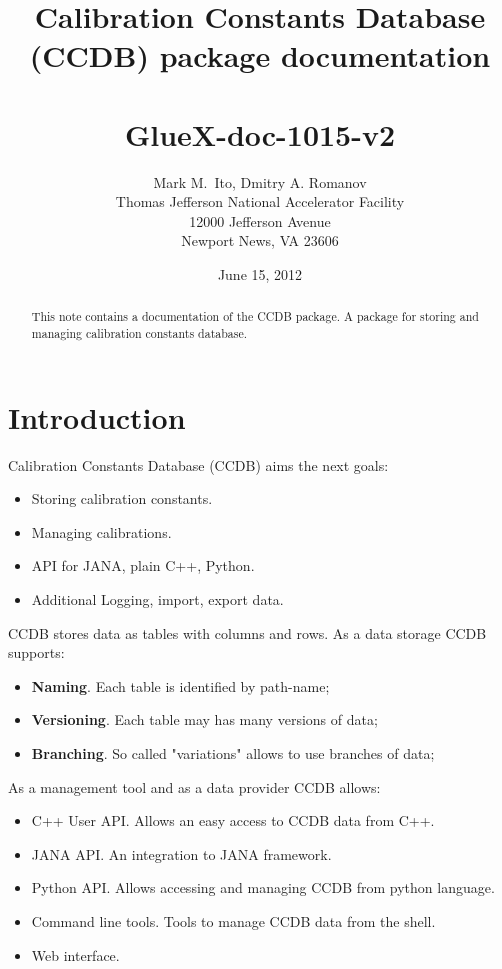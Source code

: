 \documentclass{article}
\title{Calibration Constants Database (CCDB) package documentation \\
~\\
\large GlueX-doc-1015-v2
}
\author{Mark M.\ Ito, Dmitry A. Romanov \\
Thomas Jefferson National Accelerator Facility \\
12000 Jefferson Avenue \\
Newport News, VA 23606
}
\date{June 15, 2012}
\begin{document}


\maketitle

\begin{abstract}
This note contains a documentation of the CCDB package. A package for storing
and managing calibration constants database.
\end{abstract}

\tableofcontents


\newpage
\section{Introduction}

%

Calibration Constants Database (CCDB) aims the next goals:
\begin{itemize}
  \item Storing calibration constants.
  \item Managing calibrations.
  \item API for JANA, plain C++, Python.
  \item Additional Logging, import, export data.
\end{itemize}
\vspace{1 em}

CCDB stores data as tables with columns and rows. As a data storage CCDB supports:
\begin{itemize}
\item \textbf{Naming}. Each table is identified by path-name;
\item \textbf{Versioning}. Each table may has many versions of data;
\item \textbf{Branching}. So called "variations" allows to use branches of data;
\end{itemize}
\vspace{1 em}

As a management tool and as a data provider CCDB allows:
\begin{itemize}
\item C++ User API. Allows an easy access to CCDB data from C++.
\item JANA API. An integration to JANA framework.
\item Python API. Allows accessing and managing CCDB from python language.
\item Command line tools. Tools to manage CCDB data from the shell.
\item Web interface.
\end{itemize}
\vspace{1 em}
\end{document}
